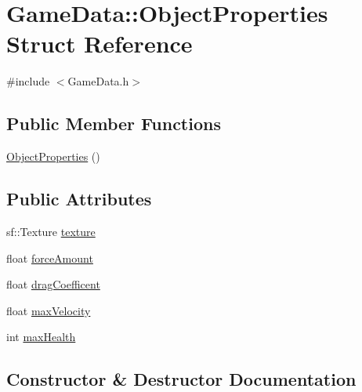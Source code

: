 \hypertarget{struct_game_data_1_1_object_properties}{}\section{Game\+Data\+:\+:Object\+Properties Struct Reference}
\label{struct_game_data_1_1_object_properties}


{\ttfamily \#include $<$Game\+Data.\+h$>$}

\subsection*{Public Member Functions}
\begin{DoxyCompactItemize}
\item 
\hyperlink{struct_game_data_1_1_object_properties_a4b6db94af9b33eb0ec7965e254627a82}{Object\+Properties} ()
\end{DoxyCompactItemize}
\subsection*{Public Attributes}
\begin{DoxyCompactItemize}
\item 
sf\+::\+Texture \hyperlink{struct_game_data_1_1_object_properties_ab9fb40f2bb03547f4ae11afd0222d2b8}{texture}
\item 
float \hyperlink{struct_game_data_1_1_object_properties_a27f3ddf9689ec26924b1b68c9af63e8c}{force\+Amount}
\item 
float \hyperlink{struct_game_data_1_1_object_properties_a3db7990df10f3463dd5c7fa9385ebe4c}{drag\+Coefficent}
\item 
float \hyperlink{struct_game_data_1_1_object_properties_a5fe58772aab2cf46298eff530c6411d8}{max\+Velocity}
\item 
int \hyperlink{struct_game_data_1_1_object_properties_a3a3d31b14f6a2615750f432f7f6b36fe}{max\+Health}
\end{DoxyCompactItemize}


\subsection{Constructor \& Destructor Documentation}
\mbox{\label{struct_game_data_1_1_object_properties_a4b6db94af9b33eb0ec7965e254627a82}} 

